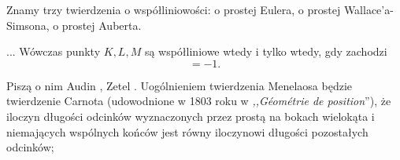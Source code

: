 Znamy trzy twierdzenia o współliniowości: o prostej Eulera, o prostej Wallace'a-Simsona, o prostej Auberta.

\begin{proposition}
	...
	Wówczas punkty $K, L, M$ są współliniowe wtedy i tylko wtedy, gdy zachodzi
	\begin{equation}
		[AMB] [BKC] [CLA] = -1.
	\end{equation}
\end{proposition}

%

Piszą o nim Audin \cite[s. 38]{audin_2003}, Zetel \cite[s. 43]{zetel_2020}.
Uogólnieniem twierdzenia Menelaosa będzie twierdzenie Carnota (udowodnione w 1803 roku w \emph{,,Géométrie de position}''), że iloczyn długości odcinków wyznaczonych przez prostą na bokach wielokąta i niemających wspólnych końców jest równy iloczynowi długości pozostałych odcinków; 

